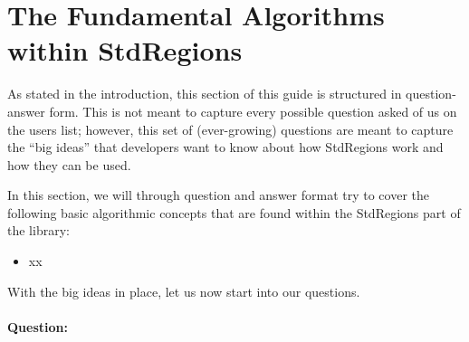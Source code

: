 %
\section{The Fundamental Algorithms within StdRegions}

As stated in the introduction, this section of this guide is structured in question-answer form.  This is not meant to capture every possible
question asked of us on the {\nek} users list; however, this set of (ever-growing) questions are meant to capture the ``big ideas'' that developers 
want to know about how StdRegions work and how they can be used.  

In this section, we will through question and answer format try to cover the following basic algorithmic concepts that are found within 
the StdRegions part of the library:

\begin{itemize}
\item xx
\end{itemize}

With the big ideas in place, let us now start into our questions.

\paragraph{Question:}